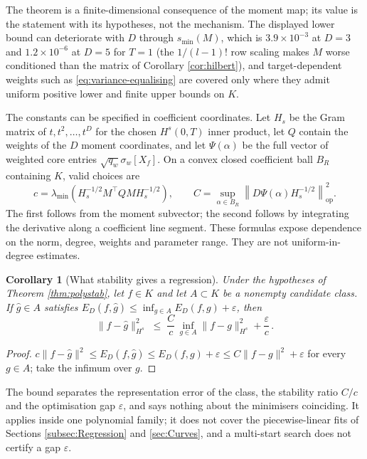 \documentclass[11pt,english]{article}
\newtheorem{corollary}[theorem]{Corollary}
\theoremstyle{definition}
\theoremstyle{remark}
\begin{document}
The theorem is a finite-dimensional consequence of the moment map; its
value is the statement with its hypotheses, not the mechanism. The
displayed lower bound can deteriorate with $D$ through $s_{\min}(M)$, which is
$3.9\times10^{-3}$ at $D=3$ and $1.2\times10^{-6}$ at $D=5$ for $T=1$
(the $1/(l-1)!$ row scaling makes $M$ worse conditioned than the matrix
of Corollary \ref{cor:hilbert}), and target-dependent weights such as
\eqref{eq:variance-equalising} are covered only where they admit
uniform positive lower and finite upper bounds on $K$.


The constants can be specified in coefficient coordinates. Let
$H_s$ be the Gram matrix of $t,t^2,\ldots,t^D$ for the chosen
$H^s(0,T)$ inner product, let $Q$ contain the weights of the $D$
moment coordinates, and let $\Psi(\alpha)$ be the full vector of
weighted core entries $\sqrt{q_w}\sigma_w[X_f]$. On a convex closed
coefficient ball $B_R$ containing $K$, valid choices are
\[
c=\lambda_{\min}\!\left(H_s^{-1/2}M^\top QM H_s^{-1/2}\right),
\qquad
C=\sup_{\alpha\in B_R}
\left\|D\Psi(\alpha)H_s^{-1/2}\right\|_{\mathrm{op}}^2.
\]
The first follows from the moment subvector; the second follows by
integrating the derivative along a coefficient line segment. These
formulas expose dependence on the norm, degree, weights and parameter
range. They are not uniform-in-degree estimates.

\begin{corollary}[What stability gives a regression]
\label{cor:regression-bound}
Under the hypotheses of Theorem \ref{thm:polystab}, let $f\in K$ and
let $A\subset K$ be a nonempty candidate class. If $\hat{g}\in A$
satisfies $E_{D}(f,\hat{g})\leq\inf_{g\in A}E_{D}(f,g)+\varepsilon$,
then
\[
\|f-\hat{g}\|_{H^{s}}^{2}\;\leq\;\frac{C}{c}\,\inf_{g\in A}\|f-g\|_{H^{s}}^{2}+\frac{\varepsilon}{c}\,.
\]
\end{corollary}

\begin{proof}
$c\|f-\hat{g}\|^{2}\leq E_{D}(f,\hat{g})\leq E_{D}(f,g)+\varepsilon\leq C\|f-g\|^{2}+\varepsilon$
for every $g\in A$; take the infimum over $g$.
\end{proof}

The bound separates the representation error of the class, the
stability ratio $C/c$ and the optimisation gap $\varepsilon$, and says
nothing about the minimisers coinciding. It applies inside one
polynomial family; it does not cover the piecewise-linear fits of
Sections \ref{subsec:Regression} and \ref{sec:Curves}, and a
multi-start search does not certify a gap $\varepsilon$.
\end{document}
